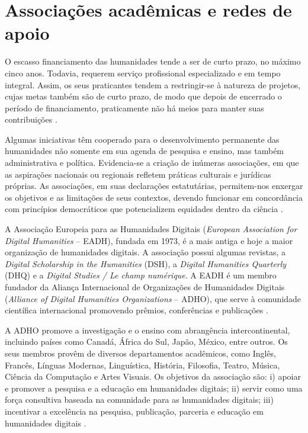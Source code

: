 \documentclass[portuguese]{textolivre}
\begin{document}
\section{Associações acadêmicas e redes de apoio}\label{sec-modelo}
O escasso financiamento das humanidades tende a ser de curto prazo, no máximo cinco anos. Todavia, requerem serviço profissional especializado e em tempo integral. Assim, os seus praticantes tendem a restringir-se à natureza de projetos, cujas metas também são de curto prazo, de modo que depois de encerrado o período de financiamento, praticamente não há meios para manter suas contribuições \cite{ghosh2015}.

Algumas iniciativas têm cooperado para o desenvolvimento permanente das humanidades não somente em sua agenda de pesquisa e ensino, mas também administrativa e política. Evidencia-se a criação de inúmeras associações, em que as aspirações nacionais ou regionais refletem práticas culturais e jurídicas próprias. As associações, em suas declarações estatutárias, permitem-nos enxergar os objetivos e as limitações de seus contextos, devendo funcionar em concordância com princípios democráticos que potencializem equidades dentro da ciência \cite{fiormonte2014}.

A Associação Europeia para as Humanidades Digitais (\textit{European Association for Digital Humanities} – EADH), fundada em 1973, é a mais antiga e hoje a maior organização de humanidades digitais. A associação possui algumas revistas, a \textit{Digital Scholarship in the Humanities} (DSH), a \textit{Digital Humanities Quarterly} (DHQ) e a \textit{Digital Studies / Le champ numérique}. A EADH é um membro fundador da Aliança Internacional de Organizações de Humanidades Digitais (\textit{Alliance of Digital Humanities Organizations} – ADHO), que serve à comunidade científica internacional promovendo prêmios, conferências e publicações \cite{eadh2024}.

A ADHO promove a investigação e o ensino com abrangência intercontinental, incluindo países como Canadá, África do Sul, Japão, México, entre outros. Os seus membros provêm de diversos departamentos acadêmicos, como Inglês, Francês, Línguas Modernas, Linguística, História, Filosofia, Teatro, Música, Ciência da Computação e Artes Visuais. Os objetivos da associação são: i) apoiar e promover a pesquisa e a educação em humanidades digitais; ii) servir como uma força consultiva baseada na comunidade para as humanidades digitais; iii) incentivar a excelência na pesquisa, publicação, parceria e educação em humanidades digitais \cite{adho2024}.
\end{document}
